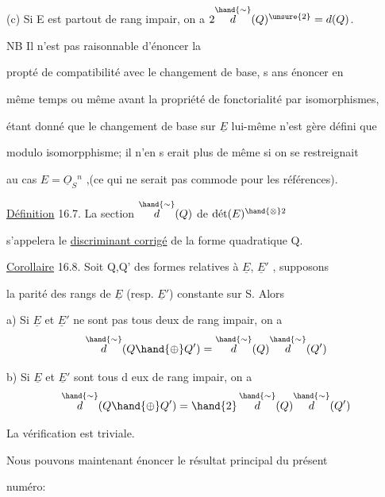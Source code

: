 
(c) Si E est partout de rang impair, on a $2\overset{\hand{\sim}}{d}(Q)^{\unsure{2}} = d(Q)$.



 \quad NB Il n'est pas raisonnable d'énoncer la

propté de compatibilité avec le changement de base, s ans énoncer en

même temps\hand{,} ou même avant\hand{,} la propriété de fonctorialité par isomorphismes,

étant donné que le changement de base sur $\underline{E}$ lui-même n'est gère défini que

modulo isomorpphisme; il n'en s erait plus de même si on se restreignait

au cas $E = \underline{O}_S{}^n$ ,(ce qui ne serait pas commode pour les références).

 \quad \uline{Définition} 16.7. La section $\overset{\hand{\sim}}{d}(Q)$ de $\text{dét}(E)^{\hand{\otimes}2}$

s'appelera le \uline{discriminant corrigé} de la forme quadratique Q.

\uline{Corollaire} 16.8. Soit Q,Q' des formes relatives à $\underline{E}$, $\underline{E}'$ , supposons

la parité des rangs de $\underline{E}$ (resp. $\underline{E}'$) constante sur S. Alors

a) Si $\underline{E}$ et $\underline{E}'$ ne sont pas tous deux de rang impair, on a
\[ \overset{\hand{\sim}}{d}(Q \hand{\oplus} Q') = \overset{\hand{\sim}}{d}(Q)\overset{\hand{\sim}}{d}(Q') \]

b) Si $\underline{E}$ et $\underline{E}'$ sont tous d eux de rang impair, on a
\[ \overset{\hand{\sim}}{d}(Q \hand{\oplus} Q') = \hand{2}\,\overset{\hand{\sim}}{d}(Q)\overset{\hand{\sim}}{d}(Q') \]

La vérification est triviale.

Nous pouvons maintenant énoncer le résultat principal du présent

numéro:

